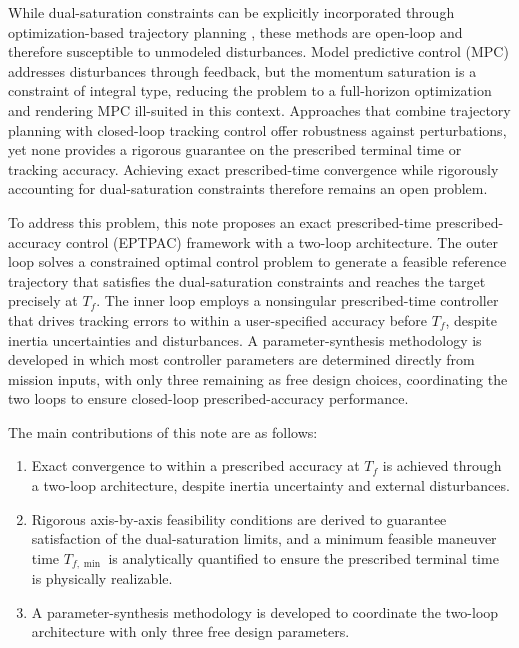 \documentclass[journal]{new-aiaa}
\begin{document}
While dual-saturation constraints can be explicitly incorporated through
optimization-based trajectory planning
\cite{kobayashi_optimal_2017,spiller_inverse_2018,celani_spacecraft_2020,fan_polynomial_2024},
these methods are open-loop and therefore susceptible to unmodeled disturbances.
Model predictive control (MPC)
\cite{mammarella_attitude_2019,yang_attitude_2023}
addresses disturbances through feedback, but the momentum saturation is a constraint of integral type,
reducing the problem to a full-horizon optimization and rendering MPC ill-suited in this context.
Approaches that combine trajectory planning with closed-loop tracking control
\cite{wallsgrove_globally_2005,hu_finite-time_2017,miller_guidance_2024}
offer robustness against perturbations, yet none provides a rigorous guarantee on
the prescribed terminal time or tracking accuracy.
Achieving exact prescribed-time convergence while rigorously accounting for
dual-saturation constraints therefore remains an open problem.

To address this problem, this note proposes an exact prescribed-time
prescribed-accuracy control (EPTPAC) framework with a two-loop architecture.
The outer loop solves a constrained optimal control problem to generate
a feasible reference trajectory that satisfies the dual-saturation constraints and reaches the target precisely at $T_f$.
The inner loop employs a nonsingular prescribed-time controller that drives tracking errors
to within a user-specified accuracy before $T_f$, despite inertia uncertainties and disturbances.
A parameter-synthesis methodology is developed in which most controller parameters
are determined directly from mission inputs, with only three remaining as free design choices,
coordinating the two loops to ensure closed-loop prescribed-accuracy performance.

The main contributions of this note are as follows:
\begin{enumerate}
  \item Exact convergence to within a prescribed accuracy at $T_f$ is achieved
  through a two-loop architecture, despite inertia uncertainty and external disturbances.
  \item Rigorous axis-by-axis feasibility conditions are derived to guarantee satisfaction
  of the dual-saturation limits, and a minimum feasible maneuver time $T_{f,\min}$ is
  analytically quantified to ensure the prescribed terminal time is physically realizable.
  \item A parameter-synthesis methodology is developed to coordinate the two-loop
  architecture with only three free design parameters.
\end{enumerate}
\end{document}
